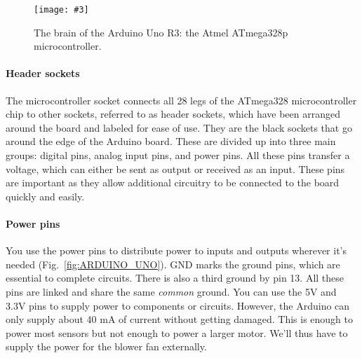 \documentclass[10pt,twoside,openright]{article}
\newcommand{\mijnfiguur}[5][ht]{            %
    \begin{figure}[#1]                      %
        \begin{center}                      %
            \texttt{[image: \#3]}        %
        \end{center}
        \caption{#4\label{#5}}          %
    \end{figure}
    }
\begin{document}
\mijnfiguur[h!]{width=6cm}{ATmega328.jpg}{The brain of the Arduino Uno R3: the Atmel ATmega328p microcontroller.}{fig:ATmega328p}

\paragraph{Header sockets}
The microcontroller socket connects all 28 legs of the ATmega328 microcontroller chip to other sockets, referred to as header sockets, which have been arranged around the board and labeled for ease of use. They are the black sockets that go around the edge of the Arduino board. These are divided up into three main groups: digital pins, analog input pins, and power pins.  All these pins transfer a voltage, which can either be sent as output or
received as an input. These pins are important as they allow additional circuitry to be connected to the board quickly and easily.

\paragraph{Power pins} You use the power pins to distribute power to inputs and outputs wherever it’s needed (Fig.~\ref{fig:ARDUINO_UNO}). GND marks the ground pins, which are essential to complete circuits. There is also a third ground by pin 13. All these pins are linked and share the same \textit{common} ground. You can use the 5V and 3.3V pins to supply power to components or circuits. However, the Arduino can only supply about 40 mA of current without getting damaged. This is enough to power most sensors but not enough to power a larger motor. We'll thus have to supply the power for the blower fan externally.
\end{document}
